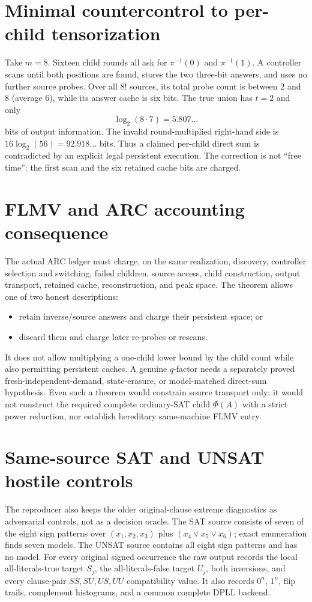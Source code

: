 \documentclass[11pt]{article}
\begin{document}
\section{Minimal countercontrol to per-child tensorization}
Take $m=8$.  Sixteen child rounds all ask for $\pi^{-1}(0)$ and
$\pi^{-1}(1)$.  A controller scans until both positions are found, stores the
two three-bit answers, and uses no further source probes.  Over all $8!$ sources,
its total probe count is between $2$ and $8$ (average $6$), while its answer
cache is six bits.  The true union has $t=2$ and only
\[
  \log_2(8\cdot7)=5.807\ldots
\]
bits of output information.  The invalid round-multiplied right-hand side is
$16\log_2(56)=92.918\ldots$ bits.  Thus a claimed per-child direct sum is
contradicted by an explicit legal persistent execution.  The correction is not
``free time'': the first scan and the six retained cache bits are charged.

\section{FLMV and ARC accounting consequence}
The actual ARC ledger must charge, on the same realization, discovery, controller
selection and switching, failed children, source access, child construction,
output transport, retained cache, reconstruction, and peak space.  The theorem
allows one of two honest descriptions:
\begin{itemize}
\item retain inverse/source answers and charge their persistent space; or
\item discard them and charge later re-probes or rescans.
\end{itemize}
It does not allow multiplying a one-child lower bound by the child count while
also permitting persistent caches.  A genuine $q$-factor needs a separately
proved fresh-independent-demand, state-erasure, or model-matched direct-sum
hypothesis.  Even such a theorem would constrain source transport only; it would
not construct the required complete ordinary-SAT child $\Phi(A)$ with a strict
power reduction, nor establish hereditary same-machine FLMV entry.

\section{Same-source SAT and UNSAT hostile controls}
The reproducer also keeps the older original-clause extreme diagnostics as
adversarial controls, not as a decision oracle.  The SAT source consists of seven
of the eight sign patterns over $(x_1,x_2,x_3)$ plus
$(x_4\vee x_5\vee x_6)$; exact enumeration finds seven models.  The UNSAT source
contains all eight sign patterns and has no model.  For every original signed
occurrence the raw output records the local all-literals-true target $S_j$, the
all-literals-false target $U_j$, both inversions, and every clause-pair
$SS,SU,US,UU$ compatibility value.  It also records $0^n$, $1^n$, flip trails,
complement histograms, and a common complete DPLL backend.
\end{document}
